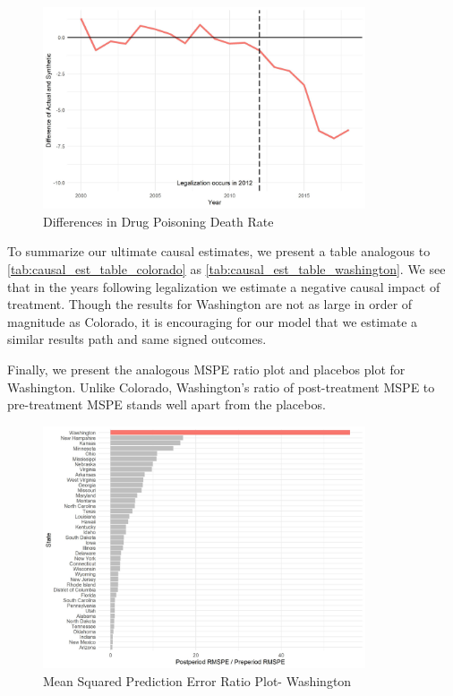 \documentclass{article}
\begin{document}
\begin{figure}[H]
	\begin{center}
		\includegraphics[width=0.85\textwidth]{diffs_plot_washington}
	\end{center}
	\caption{Differences in Drug Poisoning Death Rate}
	\label{fig:diffs_plot_washington}
\end{figure}

To summarize our ultimate causal estimates, we present a table analogous to \ref{tab:causal_est_table_colorado} as \ref{tab:causal_est_table_washington}. We see that in the years following legalization we estimate a negative causal impact of treatment. Though the results for Washington are not as large in order of magnitude as Colorado, it is encouraging for our model that we estimate a similar results path and same signed outcomes.



Finally, we present the analogous MSPE ratio plot and placebos plot for Washington. Unlike Colorado, Washington's ratio of post-treatment MSPE to pre-treatment MSPE stands well apart from the placebos. 

\begin{figure}[H]
	\begin{center}
		\includegraphics[width=0.85\textwidth]{mspe_plot_washington}
	\end{center}
	\caption{Mean Squared Prediction Error Ratio Plot- Washington}
	\label{fig:mspe_plot_washington}
\end{figure}
\end{document}
